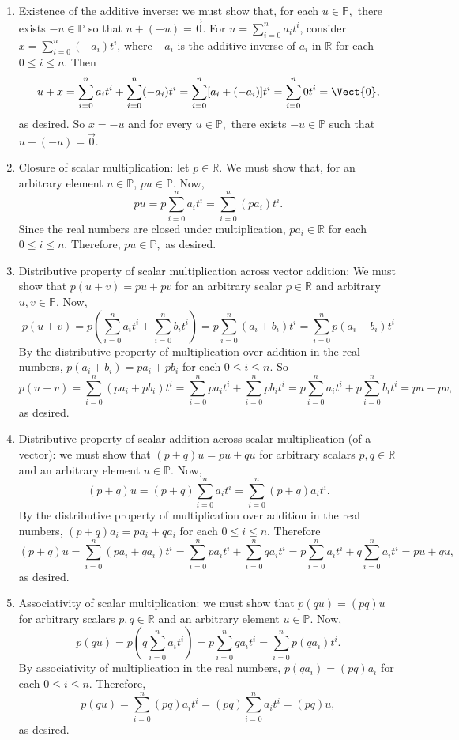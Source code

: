 \documentclass{exam}
\begin{document}
\begin{enumerate}[label=(\alph*)]
    \item Existence of the additive inverse: we must show that, for each $u\in\mathbb{P},$ there exists $-u\in\mathbb{P}$ so that $u+(-u)=\Vec{0}$. For $u=\sum_{i=0}^n a_i t^i$, consider $x=\sum_{i=0}^n (-a_i) t^i$, where $-a_i$ is the additive inverse of $a_i$ in $\mathbb{R}$ for each $0\leq i \leq n$. Then $$u+x=\sum_{i=0}^n a_i t^i+\sum_{i=0}^n (-a_i) t^i=\sum_{i=0}^n [a_i+(-a_i)] t^i=\sum_{i=0}^n 0 t^i=\Vect{0},$$ as desired. So $x=-u$ and for every $u\in\mathbb{P},$ there exists $-u\in\mathbb{P}$ such that $u+(-u)=\Vec{0}.$
    
    \item Closure of scalar multiplication: let $p\in\mathbb{R}$. We must show that, for an arbitrary element $u\in\mathbb{P}$, $pu\in\mathbb{P}$. Now, $$pu=p\sum_{i=0}^n a_i t^i=\sum_{i=0}^n (pa_i) t^i.$$ Since the real numbers are closed under multiplication, $pa_i\in\mathbb{R}$ for each $0\leq i \leq n$. Therefore, $pu\in\mathbb{P},$ as desired.
    
    \item Distributive property of scalar multiplication across vector addition: We must show that $p(u+v)=pu+pv$ for an arbitrary scalar $p\in\mathbb{R}$ and arbitrary $u,v\in\mathbb{P}$. Now, $$p(u+v)=p\left(\sum_{i=0}^n a_i t^i+\sum_{i=0}^n b_i t^i\right)=p\sum_{i=0}^n (a_i+b_i) t^i=\sum_{i=0}^n p(a_i+b_i) t^i$$
    By the distributive property of multiplication over addition in the real numbers, $p(a_i+b_i)=pa_i+pb_i$ for each $0\leq i\leq n$. So 
    $$p(u+v)=\sum_{i=0}^n (pa_i+pb_i) t^i=\sum_{i=0}^n pa_i t^i+\sum_{i=0}^n pb_i t^i=p\sum_{i=0}^n a_i t^i+p\sum_{i=0}^n b_i t^i=pu+pv,$$ as desired. 
    
    \item Distributive property of scalar addition across scalar multiplication (of a vector): we must show that $(p+q)u=pu+qu$ for arbitrary scalars $p,q\in\mathbb{R}$ and an arbitrary element $u\in\mathbb{P}$. Now, $$(p+q)u=(p+q)\sum_{i=0}^n a_i t^i=\sum_{i=0}^n (p+q)a_i t^i.$$ By the distributive property of multiplication over addition in the real numbers, $(p+q)a_i=pa_i+qa_i$ for each $0\leq i\leq n$. Therefore $$(p+q)u=\sum_{i=0}^n (pa_i+qa_i) t^i=\sum_{i=0}^n pa_i t^i+\sum_{i=0}^n qa_i t^i=p\sum_{i=0}^n a_i t^i+q\sum_{i=0}^n a_i t^i=pu+qu,$$ as desired.
    
    \item Associativity of scalar multiplication: we must show that $p(qu)=(pq)u$ for arbitrary scalars $p,q\in\mathbb{R}$ and an arbitrary element $u\in \mathbb{P}$. Now, $$p(qu)=p\left(q\sum_{i=0}^n a_i t^i\right)=p\sum_{i=0}^n qa_i t^i=\sum_{i=0}^n p(qa_i) t^i.$$ By associativity of multiplication in the real numbers, $p(qa_i)=(pq)a_i$ for each $0\leq i\leq n$. Therefore, $$p(qu)=\sum_{i=0}^n (pq)a_i t^i=(pq)\sum_{i=0}^n a_i t^i=(pq)u,$$ as desired.
    

\end{enumerate}
\end{document}
